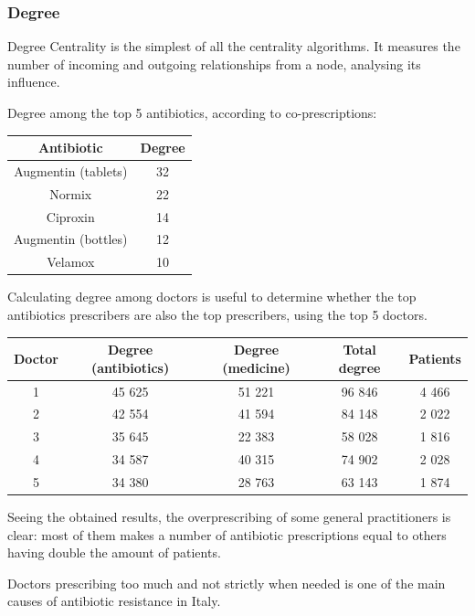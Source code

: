 \subsubsection{Degree}
Degree Centrality is the simplest of all the centrality algorithms. It measures the number of incoming and outgoing relationships from a node, analysing its influence.

Degree among the top 5 antibiotics, according to co-prescriptions:
\begin{center}
	\begin{tabular}{c|c}
		Antibiotic & Degree \\
		\hline
		Augmentin (tablets) & 32 \\
		\hline
		Normix & 22 \\
		\hline
		Ciproxin & 14 \\
		\hline
		Augmentin (bottles) & 12 \\
		\hline
		Velamox & 10 \\
	\end{tabular}
\end{center}

Calculating degree among doctors is useful to determine whether the top antibiotics prescribers are also the top prescribers, using the top 5 doctors.

\begin{center}
	\begin{tabular}{c|c|c|c|c}
		Doctor & Degree (antibiotics) & Degree (medicine) & Total degree & Patients \\
		\hline
		1 & 45 625 & 51 221 & 96 846 & 4 466 \\
		\hline
		2 & 42 554 & 41 594 & 84 148 & 2 022 \\
		\hline
		3 & 35 645 & 22 383 & 58 028 & 1 816 \\
		\hline
		4 & 34 587 & 40 315 & 74 902 & 2 028 \\
		\hline
		5 & 34 380 & 28 763 & 63 143 & 1 874
	\end{tabular}
\end{center}

Seeing the obtained results, the overprescribing of some general practitioners is clear: most of them makes a number of antibiotic prescriptions equal to others having double the amount of patients.

Doctors prescribing too much and not strictly when needed is one of the main causes of antibiotic resistance in Italy.


